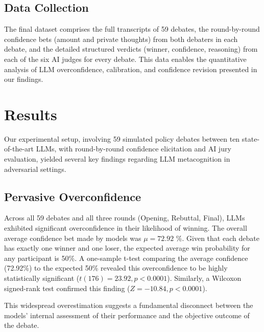 \documentclass{article}
\begin{document}
\subsection{Data Collection}
\label{subsec:data_collection}
The final dataset comprises the full transcripts of 59 debates, the round-by-round confidence bets (amount and private thoughts) from both debaters in each debate, and the detailed structured verdicts (winner, confidence, reasoning) from each of the six AI judges for every debate. This data enables the quantitative analysis of LLM overconfidence, calibration, and confidence revision presented in our findings.


\section{Results}
\label{sec:results}

\lstset{style=promptstyle} %

Our experimental setup, involving 59 simulated policy debates between ten state-of-the-art LLMs, with round-by-round confidence elicitation and AI jury evaluation, yielded several key findings regarding LLM metacognition in adversarial settings.

\subsection{Pervasive Overconfidence}

Across all 59 debates and all three rounds (Opening, Rebuttal, Final), LLMs exhibited significant overconfidence in their likelihood of winning. The overall average confidence bet made by models was $\mu = 72.92$ \%. Given that each debate has exactly one winner and one loser, the expected average win probability for any participant is 50\%. A one-sample t-test comparing the average confidence (72.92\%) to the expected 50\% revealed this overconfidence to be highly statistically significant ($t(176) = 23.92, p < 0.0001$). Similarly, a Wilcoxon signed-rank test confirmed this finding ($Z= -10.84, p < 0.0001$).

This widespread overestimation suggests a fundamental disconnect between the models' internal assessment of their performance and the objective outcome of the debate.
\end{document}
